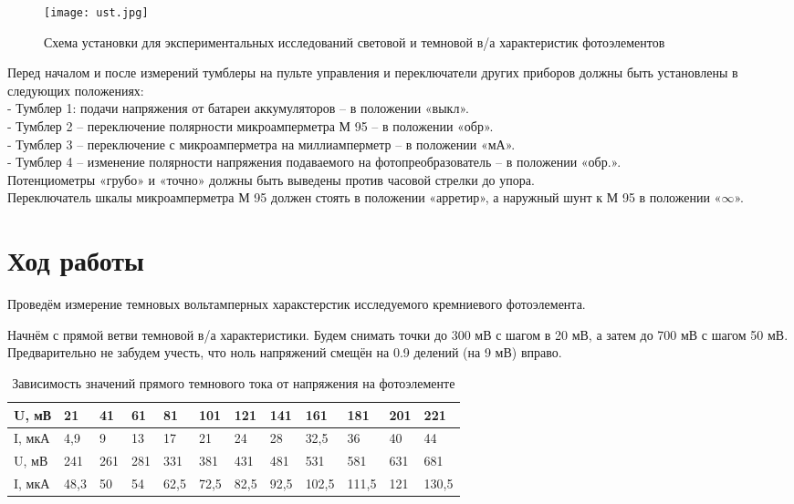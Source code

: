 \documentclass[a4paper,12pt]{article} %
\begin{document}
\begin{figure}[!h]
		\centering	
		\texttt{[image: ust.jpg]}
		\caption{Схема установки для экспериментальных исследований световой и темновой в/а характеристик фотоэлементов}
		\label{pic:scheme}
	\end{figure}

Перед началом и после измерений тумблеры на пульте управления и переключатели других приборов должны быть установлены в следующих положениях:\\
- Тумблер 1: подачи напряжения от батареи аккумуляторов – в положении «выкл».\\
- Тумблер 2 – переключение полярности микроамперметра М 95 – в положении «обр».\\
- Тумблер 3 – переключение с микроамперметра на миллиамперметр – в положении «мА».\\
- Тумблер 4 – изменение полярности напряжения подаваемого на фотопреобразователь – в положении «обр.».\\
Потенциометры «грубо» и «точно» должны быть выведены против часовой стрелки до упора.\\
Переключатель шкалы микроамперметра М 95 должен стоять в положении «арретир», а наружный шунт к М 95 в положении «$\infty$».\\

\section{Ход работы}

Проведём измерение темновых вольтамперных харакстерстик исследуемого кремниевого фотоэлемента.

Начнём с прямой ветви темновой в/а характеристики. Будем снимать точки до 300 мВ с шагом в 20 мВ, а затем до 700 мВ с шагом 50 мВ. Предварительно не забудем учесть, что ноль напряжений смещён на 0.9 делений (на 9 мВ) вправо.

\begin{table}[H]
\centering
\caption{Зависимость значений прямого темнового тока от напряжения на фотоэлементе}
\begin{tabular}{|l|l|l|l|l|l|l|l|l|l|l|l|}
\hline
U, мВ  & 21   & 41  & 61  & 81   & 101  & 121  & 141  & 161   & 181   & 201 & 221   \\ \hline
I, мкА & 4,9  & 9   & 13  & 17   & 21   & 24   & 28   & 32,5  & 36    & 40  & 44    \\ \hline
U, мВ  & 241  & 261 & 281 & 331  & 381  & 431  & 481  & 531   & 581   & 631 & 681   \\ \hline
I, мкА & 48,3 & 50  & 54  & 62,5 & 72,5 & 82,5 & 92,5 & 102,5 & 111,5 & 121 & 130,5 \\ \hline
\end{tabular}
\label{tab:direct}
\end{table}
\end{document}
